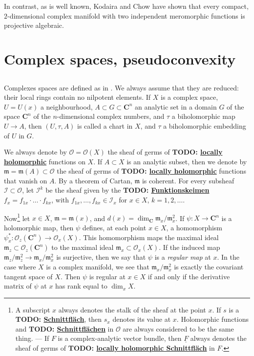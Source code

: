 \documentclass{article}
\theoremstyle{plain}
\theoremstyle{definition}
\newcommand{\CC}{\mathbf{C}}
\newcommand{\sh}{\mathcal}
\newcommand{\fk}{\mathfrak}
\newcommand{\unsure}[1]{\textbf{TODO: \underline{#1}}}
\begin{document}
In contrast, as is well known, Kodaira and Chow \cite{4} have shown that every compact, $2$-dimensional complex manifold with two independent meromorphic functions is projective algebraic.


\section{Complex spaces, pseudoconvexity}
\label{1}

\subsection{}
\label{1.1}

Complexes spaces are defined as in \cite{10}.
We always assume that they are reduced: their local rings contain no nilpotent elements.
If $X$ is a complex space, $U=U(x)$ a neighbourhood, $A\subset G\subset \CC^n$ an analytic set in a domain $G$ of the space $\CC^n$ of the $n$-dimensional complex numbers, and $\tau$ a biholomorphic map $U\to A$, then $(U,\tau,A)$ is called a chart in $X$, and $\tau$ a biholomorphic embedding of $U$ in $G$.

We always denote by $\sh{O}=\sh{O}(X)$ the sheaf of germs of \unsure{locally holomorphic} functions on $X$.
If $A\subset X$ is an analytic subset, then we denote by $\fk{m}=\fk{m}(A)\subset\sh{O}$ the sheaf of germs of \unsure{locally holomorphic} functions that vanish on $A$.
By a theorem of Cartan, $\fk{m}$ is coherent.
For every subsheaf $\sh{I}\subset\sh{O}$, let $\sh{I}^k$ be the sheaf given by the \unsure{Funktionskeimen} $f_x=f_{1x}\cdot\ldots\cdot f_{kx}$, with $f_{1x},\ldots,f_{kx}\in\sh{I}_x$ for $x\in X$, $k=1,2,\ldots$.

Now\footnote{
  A subscript $x$ always denotes the stalk of the sheaf at the point $x$.
  If $s$ is a \unsure{Schnittfläch}, then $s_x$ denotes its value at $x$.
  Holomorphic functions and \unsure{Schnittflächen} in $\sh{O}$ are always considered to be the same thing.
  --- If $F$ is a complex-analytic vector bundle, then $\underline{F}$ always denotes the sheaf of germs of \unsure{locally holomorphic Schnittfläch} in $F$.
}%
let $x\in X$, $\fk{m}=\fk{m}(x)$, and $d(x)=\dim_\CC\fk{m}_x/\fk{m}_x^2$.
If $\psi\colon X\to\CC^n$ is a holomorphic map, then $\psi$ defines, at each point $x\in X$, a homomorphism $\psi_x^*\colon\sh{O}_z(\CC^n)\to\sh{O}_x(X)$.
This homomorphism maps the maximal ideal $\fk{m}_z\subset\sh{O}_z(\CC^n)$ to the maximal ideal $\fk{m}_x\subset\sh{O}_x(X)$.
If the induced map $\fk{m}_z/\fk{m}_z^2\to\fk{m}_x/\fk{m}_x^2$ is surjective, then we say that $\psi$ is a \emph{regular map} at $x$.
In the case where $X$ is a complex manifold, we see that $\fk{m}_x/\fk{m}_x^2$ is exactly the covariant tangent space of $X$.
Then $\psi$ is regular at $x\in X$ if and only if the derivative matrix of $\psi$ at $x$ has rank equal to $\dim_x X$.
\end{document}
